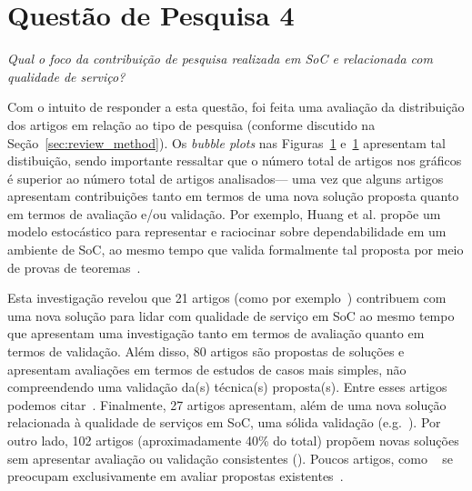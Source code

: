 \section{Questão de Pesquisa 4}

\emph{Qual o foco da contribuição de pesquisa realizada em SoC e relacionada com qualidade de serviço? }

Com o intuito de responder a esta questão, foi feita uma avalia\c c\~{a}o da distribui\c c\~{a}o dos 
artigos em rela\c c\~{a}o ao tipo de pesquisa (conforme discutido na Se\c c\~{a}o~\ref{sec:review_method}). 
Os \emph{bubble plots} nas Figuras~\ref{} e~\ref{}  apresentam tal distibui\c c\~{a}o, sendo importante 
ressaltar que o n\'{u}mero total de artigos nos gr\'{a}ficos \'{e} superior ao n\'{u}mero total de artigos analisados--- 
uma vez que alguns artigos apresentam contribui\c c\~{o}es tanto em termos de uma nova solu\c c\~{a}o proposta 
quanto em termos de avalia\c c\~{a}o e/ou valida\c c\~{a}o. Por exemplo, Huang et al. prop\~{o}e um 
modelo estoc\'{a}stico para representar e raciocinar sobre dependabilidade em um ambiente de SoC, ao mesmo tempo 
que valida formalmente tal proposta por meio de provas de teoremas~\cite{huang:scc2011}.

Esta investiga\c c\~{a}o revelou que 21 artigos (como por exemplo~\cite{jeong:fqs2009,ardagna:jss2010}) 
contribuem com uma nova solu\c c\~{a}o para 
lidar com qualidade de servi\c co em SoC ao mesmo tempo que apresentam uma investiga\c c\~{a}o tanto 
em termos de avalia\c c\~{a}o quanto em termos de valida\c c\~{a}o. Al\'{e}m disso, 80 
artigos s\~{a}o propostas de solu\c c\~{o}es e apresentam 
avalia\c c\~{o}es em termos de estudos de casos mais simples, n\~{a}o compreendendo uma 
valida\c c\~{a}o da(s) t\'{e}cnica(s) proposta(s). Entre esses artigos podemos 
citar~\cite{filieri:faa2012, pernici:services2011,nascimento:splc2011}. Finalmente, 27 artigos apresentam, 
al\'{e}m de uma nova solu\c c\~{a}o relacionada \`{a} qualidade de servi\c cos em SoC, 
uma s\'{o}lida valida\c c\~{a}o (e.g.~\cite{huang:scc2011,binshtok:icsoc2009}).    
Por outro lado, 102 artigos (aproximadamente 40\% do total) prop\~{o}em novas 
solu\c c\~{o}es sem apresentar avalia\c c\~{a}o ou valida\c c\~{a}o consistentes (\cite{balfagih:icime2011,fiadeiro:fac2011,khazankin:scc2011}). 
Poucos artigos, como ~\cite{} se preocupam exclusivamente em avaliar propostas existentes~\cite{}.  